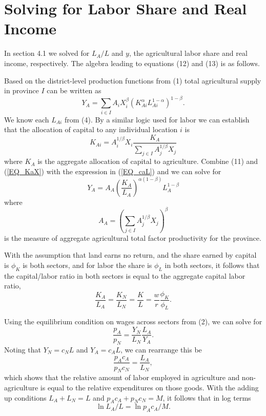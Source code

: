 \documentclass[11pt]{article}
\begin{document}
\section{Solving for Labor Share and Real Income}\label{APP_solve}
In section 4.1 we solved for $L_A/L$ and $y$, the agricultural labor share and real income, respectively. The algebra leading to equations (12) and (13) is as follows.

Based on the district-level production functions from (1) total agricultural supply in province $I$ can be written as
\begin{equation}
Y_A = \sum_{i \in I} A_{i} X_{i}^{\beta} \left(K_{Ai}^{\alpha}L_{Ai}^{1-\alpha}\right)^{1-\beta}. \label{EQ_caL}
\end{equation}
We know each $L_{Ai}$ from (4). By a similar logic used for labor we can establish that the allocation of capital to any individual location $i$ is
\begin{equation}
    K_{Ai} = A_{i}^{1/\beta} X_i \frac{K_A}{\sum_{j\in I} A_{j}^{1/\beta}X_{j}} \label{EQ_KaX}
\end{equation}
where $K_A$ is the aggregate allocation of capital to agriculture. Combine (11) and (\ref{EQ_KaX}) with the expression in (\ref{EQ_caL}) and we can solve for 
\begin{equation}
    Y_A = A_A \left(\frac{K_A}{L_A}\right)^{\alpha(1-\beta)} L_A^{1-\beta} \nonumber
\end{equation}
where 
\begin{equation}
    A_A = \left(\sum_{j\in I} A_{j}^{1/\beta}X_{j} \right)^\beta \nonumber
\end{equation}
is the measure of aggregate agricultural total factor productivity for the province. 

With the assumption that land earns no return, and the share earned by capital is $\phi_K$ is both sectors, and for labor the share is $\phi_L$ in both sectors, it follows that the capital/labor ratio in both sectors is equal to the aggregate capital labor ratio,
\begin{equation}
    \frac{K_A}{L_A} = \frac{K_N}{L_N} = \frac{K}{L} = \frac{w}{r}\frac{\phi_K}{\phi_L}. \nonumber
\end{equation}

Using the equilibrium condition on wages across sectors from (2), we can solve for 
\begin{equation}
    \frac{p_A}{p_N} = \frac{Y_N}{L_N}\frac{L_A}{Y_A}.\label{EQ_papn}
\end{equation}
Noting that $Y_N = c_N L$ and $Y_A = c_A L$, we can rearrange this be
\begin{equation}
    \frac{p_A c_A}{p_N c_N} = \frac{L_A}{L_N}, \label{EQ_expend}
\end{equation}
which shows that the relative amount of labor employed in agriculture and non-agriculture is equal to the relative expenditures on those goods. With the adding up conditions $L_A + L_N = L$ and $p_Ac_A + p_N c_N = M$, it follows that in log terms
\begin{equation}
    \ln L_A/L = \ln p_A c_A/M. \label{EQ_pacaM}
\end{equation}
\end{document}
